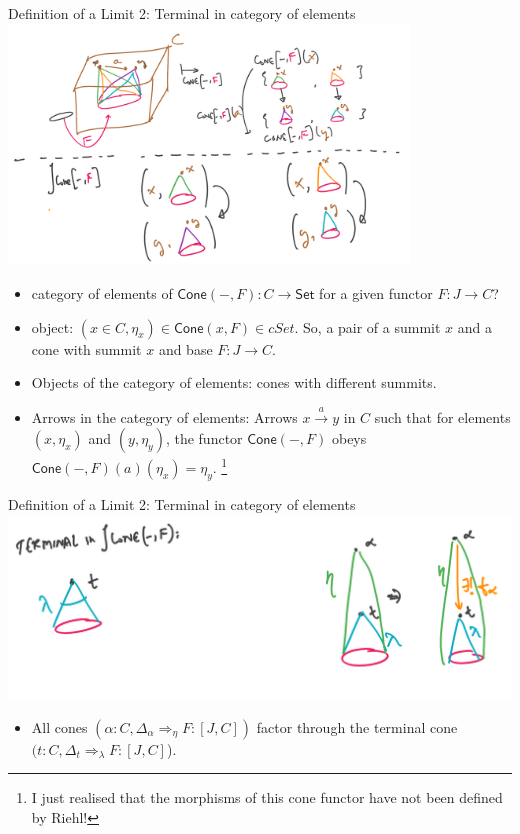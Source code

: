 \documentclass[8pt]{beamer}
\newcommand{\nt}{\Rightarrow}
\newcommand{\cat}[1]{\mathsf{#1}}
\newcommand{\cSet}{\cat{Set}}
\newcommand{\cCone}{\cat{Cone}}
\begin{document}
\begin{frame}{Definition of a Limit 2: Terminal in category of elements}
    \includegraphics[width=0.8\textwidth]{./category-of-elements-description.png}
    {\footnotesize
    \begin{itemize}
        \item category of elements of $\cCone(-, F): C \to \cSet$ for a given functor $F: J \to C$?
        \item object: $(x \in C, \eta_x) \in \cCone(x, F) \in cSet$. So, a pair of a summit $x$
            and a cone with summit $x$ and base $F: J \to C$.
        \item Objects of the category of elements: cones with different summits.
        \item Arrows in the category of elements: Arrows $ x \xrightarrow{a} y$
            in $C$ such that for elements $(x, \eta_x)$ and $(y, \eta_y)$, the
            functor $\cCone(-, F)$ obeys $\cCone(-, F)(a)(\eta_x) = \eta_y$.
            \footnote{I just realised that the morphisms of this cone functor
            have not been defined by Riehl!}
    \end{itemize} }
\end{frame}

\begin{frame}{Definition of a Limit 2: Terminal in category of elements}
    \includegraphics[width=\textwidth]{./category-of-elements-terminal.png}
    \begin{itemize}
        \item All cones $(\alpha:C, \Delta_\alpha \nt_\eta F : [J, C])$ 
            factor through the terminal cone $(t: C, \Delta_t \nt_\lambda F : [J, C]$).
    \end{itemize}
\end{frame}
\end{document}

